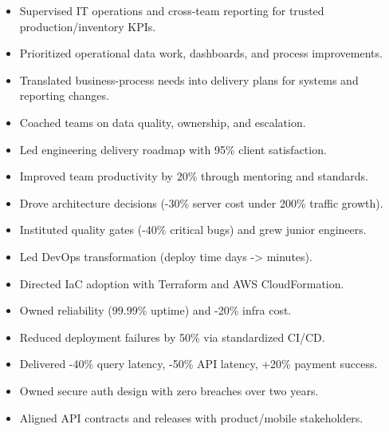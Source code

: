 \begin{itemize}
  \item Supervised IT operations and cross-team reporting for trusted production/inventory KPIs.
  \item Prioritized operational data work, dashboards, and process improvements.
  \item Translated business-process needs into delivery plans for systems and reporting changes.
  \item Coached teams on data quality, ownership, and escalation.
\end{itemize}
\vspace{4pt}
\begin{itemize}
  \item Led engineering delivery roadmap with 95\% client satisfaction.
  \item Improved team productivity by 20\% through mentoring and standards.
  \item Drove architecture decisions (-30\% server cost under 200\% traffic growth).
  \item Instituted quality gates (-40\% critical bugs) and grew junior engineers.
\end{itemize}
\vspace{4pt}
\begin{itemize}
  \item Led DevOps transformation (deploy time days -> minutes).
  \item Directed IaC adoption with Terraform and AWS CloudFormation.
  \item Owned reliability (99.99\% uptime) and -20\% infra cost.
  \item Reduced deployment failures by 50\% via standardized CI/CD.
\end{itemize}
\vspace{4pt}
\begin{itemize}
  \item Delivered -40\% query latency, -50\% API latency, +20\% payment success.
  \item Owned secure auth design with zero breaches over two years.
  \item Aligned API contracts and releases with product/mobile stakeholders.
\end{itemize}
